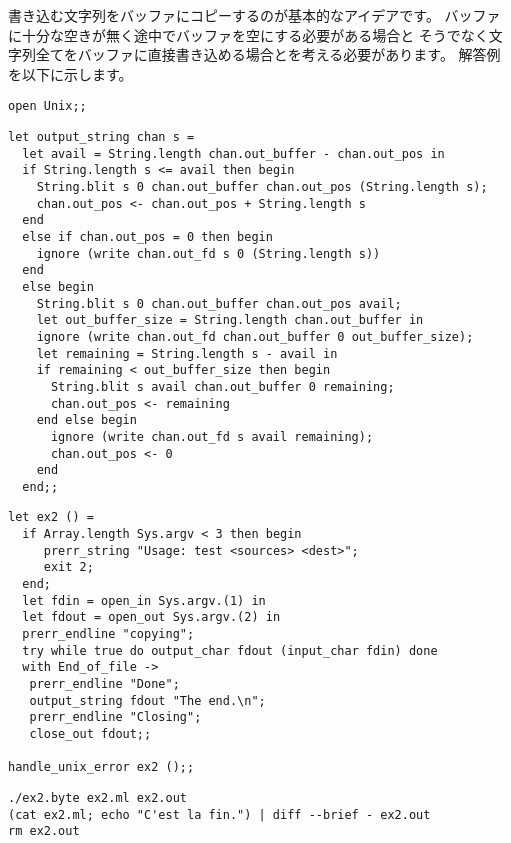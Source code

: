 \begin{answer}
書き込む文字列をバッファにコピーするのが基本的なアイデアです。
バッファに十分な空きが無く途中でバッファを空にする必要がある場合と
そうでなく文字列全てをバッファに直接書き込める場合とを考える必要があります。
解答例を以下に示します。
%
\begin{lstlisting}
open Unix;;
\end{lstlisting}
%
\begin{lstlisting}
let output_string chan s =
  let avail = String.length chan.out_buffer - chan.out_pos in
  if String.length s <= avail then begin
    String.blit s 0 chan.out_buffer chan.out_pos (String.length s);
    chan.out_pos <- chan.out_pos + String.length s
  end
  else if chan.out_pos = 0 then begin
    ignore (write chan.out_fd s 0 (String.length s))
  end
  else begin
    String.blit s 0 chan.out_buffer chan.out_pos avail;
    let out_buffer_size = String.length chan.out_buffer in
    ignore (write chan.out_fd chan.out_buffer 0 out_buffer_size);
    let remaining = String.length s - avail in
    if remaining < out_buffer_size then begin
      String.blit s avail chan.out_buffer 0 remaining;
      chan.out_pos <- remaining
    end else begin
      ignore (write chan.out_fd s avail remaining);
      chan.out_pos <- 0
    end
  end;;
\end{lstlisting}
%
\begin{lstlisting}
let ex2 () =
  if Array.length Sys.argv < 3 then begin
     prerr_string "Usage: test <sources> <dest>";
     exit 2;
  end;
  let fdin = open_in Sys.argv.(1) in
  let fdout = open_out Sys.argv.(2) in
  prerr_endline "copying";
  try while true do output_char fdout (input_char fdin) done
  with End_of_file ->
   prerr_endline "Done";
   output_string fdout "The end.\n";
   prerr_endline "Closing";
   close_out fdout;;

handle_unix_error ex2 ();;
\end{lstlisting}
%
\begin{lstlisting}
./ex2.byte ex2.ml ex2.out
(cat ex2.ml; echo "C'est la fin.") | diff --brief - ex2.out
rm ex2.out
\end{lstlisting}
\end{answer}


